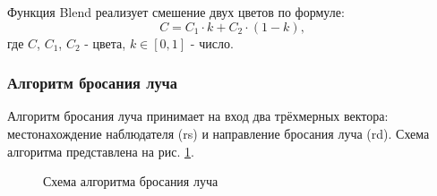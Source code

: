 \documentclass[a4paper, 14pt]{report} %
\begin{document}
	Функция Blend реализует смешение двух цветов по формуле:
	\begin{equation}
		C = C_1\cdot k+C_2\cdot(1-k),
	\end{equation}
	где $C$, $C_1$, $C_2$ - цвета, $k\in[0, 1]$ - число.

	\subsubsection{Алгоритм бросания луча}
	Алгоритм бросания луча принимает на вход два трёхмерных вектора: местонахождение наблюдателя (rs) и направление бросания луча (rd). Схема алгоритма представлена на рис. \ref{fig:throw_ray}.
	
	\begin{figure}[!ht]
		\caption{Схема алгоритма бросания луча}
		\label{fig:throw_ray}
	\end{figure}
\end{document}
